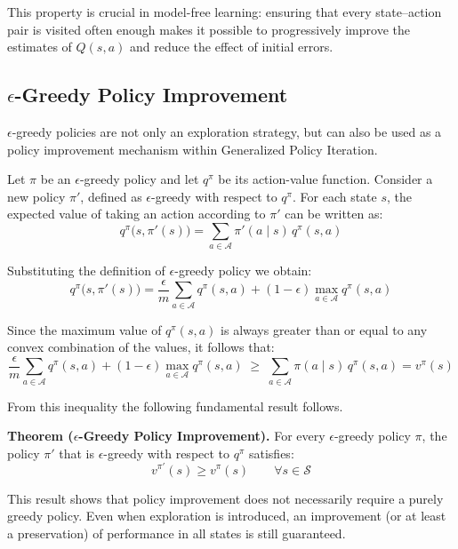 This property is crucial in model-free learning: ensuring that every state–action pair is visited often enough makes it possible to progressively improve the estimates of $Q(s,a)$ and reduce the effect of initial errors.


\subsection{$\epsilon$-Greedy Policy Improvement}

$\epsilon$-greedy policies are not only an exploration strategy, but can also be used as a policy improvement mechanism within Generalized Policy Iteration.

Let $\pi$ be an $\epsilon$-greedy policy and let $q^\pi$ be its action-value function. Consider a new policy $\pi'$, defined as $\epsilon$-greedy with respect to $q^\pi$. For each state $s$, the expected value of taking an action according to $\pi'$ can be written as:
\[
q^\pi\bigl(s, \pi'(s)\bigr)
= \sum_{a \in \mathcal{A}} \pi'(a \mid s)\, q^\pi(s,a)
\]

Substituting the definition of $\epsilon$-greedy policy we obtain:
\[
q^\pi\bigl(s, \pi'(s)\bigr)
=
\frac{\epsilon}{m} \sum_{a \in \mathcal{A}} q^\pi(s,a)
+
(1 - \epsilon) \max_{a \in \mathcal{A}} q^\pi(s,a)
\]

Since the maximum value of $q^\pi(s,a)$ is always greater than or equal to any convex combination of the values, it follows that:
\[
\frac{\epsilon}{m} \sum_{a \in \mathcal{A}} q^\pi(s,a)
+
(1 - \epsilon) \max_{a \in \mathcal{A}} q^\pi(s,a)
\;\ge\;
\sum_{a \in \mathcal{A}} \pi(a \mid s)\, q^\pi(s,a)
=
v^\pi(s)
\]

From this inequality the following fundamental result follows.

\medskip

\textbf{Theorem ($\epsilon$-Greedy Policy Improvement).}
For every $\epsilon$-greedy policy $\pi$, the policy $\pi'$ that is $\epsilon$-greedy with respect to $q^\pi$ satisfies:
\[
v^{\pi'}(s) \ge v^\pi(s) \qquad \forall s \in \mathcal{S}
\]

\medskip

This result shows that policy improvement does not necessarily require a purely greedy policy. Even when exploration is introduced, an improvement (or at least a preservation) of performance in all states is still guaranteed.



